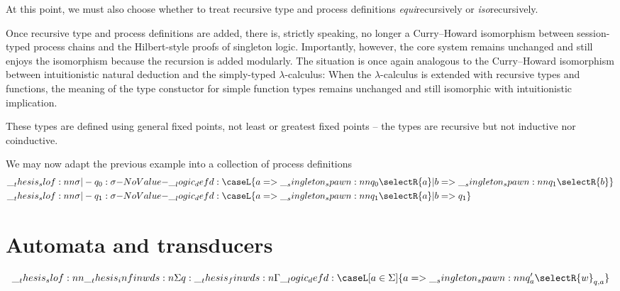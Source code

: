 At this point, we must also choose whether to treat recursive type and process definitions \emph{equi}\-recursively or \emph{iso}\-recursively.


Once recursive type and process definitions are added, there is, strictly speaking, no longer a Curry--Howard isomorphism between session-typed process chains and the Hilbert-style proofs of singleton logic.
Importantly, however, the core system remains unchanged and still enjoys the isomorphism because the recursion is added modularly.
The situation is once again analogous to the Curry--Howard isomorphism between intuitionistic natural deduction and the simply-typed $\lambda$-calculus:
When the $\lambda$-calculus is extended with recursive types and functions, the meaning of the type constuctor for simple function types remains unchanged and still isomorphic with intuitionistic implication.

These types are defined using general fixed points, not least or greatest fixed points -- the types are recursive but not inductive nor coinductive.



\begin{example*}
  We may now adapt the previous example into a collection of process definitions
  \begin{align*}
    \slof{\sigma |- q_0 : \sigma} &\defd
      \caseL{a => \spawn{q_0}{\selectR{a}}
           | b => \spawn{q_1}{\selectR{b}}}
    \\
    \slof{\sigma |- q_1 : \sigma} &\defd
      \caseL{a => \spawn{q_1}{\selectR{a}}
           | b => q_1}
  \end{align*}
\end{example*}


\section{Automata and transducers}

\begin{equation*}
  \slof{\infinwds{\Sigma} |- q : \finwds{\Gamma}}
  \defd
  \caseL[a \in \Sigma]{a => \spawn{q'_a}{\selectR{w}_{q,a}}}
\end{equation*}

